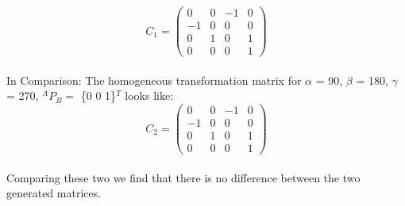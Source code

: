 		$$
		C_{1} =
		\begin{pmatrix}
			0 & 0 & -1 & 0\\
			-1 & 0 & 0 & 0\\
			0  & 1  & 0 & 1\\
			0 & 0 & 0 & 1
		\end{pmatrix}
		$$		
		\\
		In Comparison:
		The homogeneous transformation matrix for\newline
		$\alpha$ = 90\degree, 
		$\beta$ = 180\degree, 
		$\gamma$ = 270\degree, $^{A}P_{B} =$ \{0 0 1\}$^{T}$\newline
		looks like:\\
		
		$$
		C_{2} =
		\begin{pmatrix}
			0 & 0 & -1 & 0\\
			-1 & 0 & 0 & 0\\
			0  & 1  & 0 & 1\\
			0 & 0 & 0 & 1
		\end{pmatrix}
		$$		
		\\
		Comparing these two we find that there is no difference between the two generated matrices.